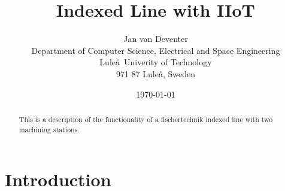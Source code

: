 \documentclass[12pt]{article}
\title{Indexed Line with IIoT}
\author{Jan van Deventer \\Department of Computer Science, Electrical and Space Engineering\\Lule\aa\ Univerity of Technology \\ 971 87 Lule\aa, Sweden}
\date{\today}
\begin{document}
\maketitle

\begin{abstract}
This is a description of the functionality of a fischertechnik indexed line with two machining stations.
\end{abstract}

\section{Introduction}




%
%
\end{document}
